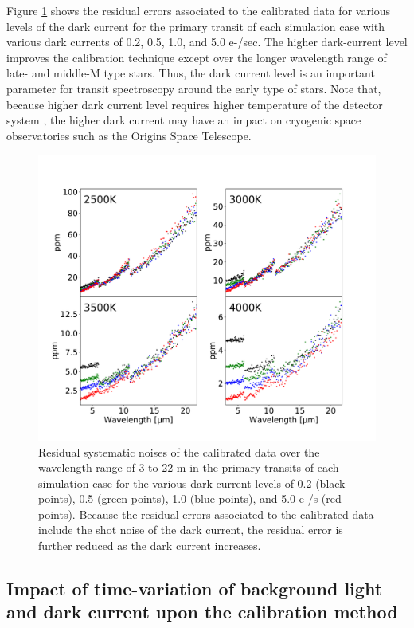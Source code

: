 \documentclass{aastex62}
\begin{document}
Figure \ref{fig:sn_dark} shows the residual errors associated to the calibrated data for various levels of the dark current for the primary transit of each simulation case with various dark currents of 0.2, 0.5, 1.0, and 5.0 e-/sec. The higher dark-current level improves the calibration technique except over the longer wavelength range of late- and middle-M type stars. Thus, the dark current level is an important parameter for transit spectroscopy around the early type of stars. Note that, because higher dark current level requires higher temperature of the detector system \citep[e.g.,][]{2003SPIE.4850..890E}, the higher dark current may have an impact on cryogenic space observatories such as the Origins Space Telescope.

\begin{figure}[H]
\begin{center}
\includegraphics[width=12cm]{sn_dark.pdf}
\caption{Residual systematic noises of the calibrated data over the wavelength range of 3 to 22 \textmu m in the primary transits of each simulation case for the various dark current levels of 0.2 (black points), 0.5 (green points), 1.0 (blue points), and 5.0 e-/s (red points). Because the residual errors associated to the calibrated data include the shot noise of the dark current, the residual error is further reduced as the dark current increases. \label{fig:sn_dark}}
\end{center}
\end{figure}


\subsection{Impact of time-variation of background light and dark current upon the calibration method} \label{subsec:time_variation}
\end{document}
